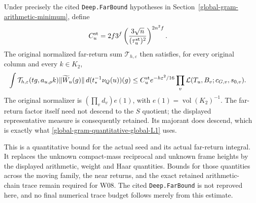 Under precisely the cited \texttt{Deep.FarBound} hypotheses
in Section~\ref{global-gram-arithmetic-minimum}, define
\[
 C_u^{\rm st}=2f3^f
        \left(\frac{3\sqrt n}{(\tau_u^{\rm st})^2}\right)^{2n^2f}.
\]
The original normalized far-return sum $\mathcal T_{h,\varepsilon}$
then satisfies, for every original column and every $k\in K_2$,
\begin{equation}\label{global-gram-quantitative-far}
 \int \mathcal T_{h,\varepsilon}(tg,a_{u,\rho}k)
         \|\widetilde W_u(g)\|\,d(t^{-1}_*\nu_Q(u))(g)
 \le C_u^{\rm st}e^{-h\varepsilon^2/16}
       \prod_v {\cal L}(T_u,B_v;c_{G,v},s_{0,v}).
\end{equation}
The original normalizer is
$(\prod_vd_v)e(1)$, with $e(1)=\operatorname{vol}(K_2)^{-1}$.
The far-return factor itself need not descend to the $S$ quotient;
the displayed representative measure is consequently retained.
Its majorant does descend, which is exactly what
\eqref{global-gram-quantitative-global-L1} uses.

This is a quantitative bound for the actual seed and its actual
far-return integral.  It replaces the unknown compact-mass
reciprocal and unknown frame heights by the displayed arithmetic,
weight and Haar quantities.  Bounds for those quantities across
the moving family, the near returns, and the exact retained
arithmetic-chain trace remain required for W08.  The cited
\texttt{Deep.FarBound} is not reproved here, and no final numerical
trace budget follows merely from this estimate.
